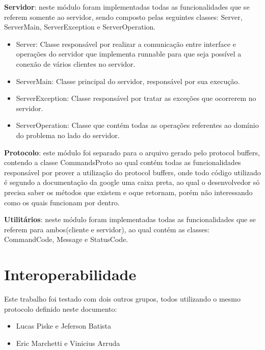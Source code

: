 \documentclass[
	11pt,				%
	oneside,			%
	a4paper,			%
	english,			%
	brazil,				%
	]{article}
\begin{document}
\textbf{Servidor}: neste módulo foram implementadas todas as funcionalidades que se referem somente ao servidor, sendo composto pelas seguintes classes:
Server, ServerMain, ServerException e ServerOperation.

\begin{itemize}
 \item Server: Classe responsável por realizar a comunicação entre interface e operações do servidor que implementa runnable para que seja possível a conexão de vários clientes no servidor.
 \item ServerMain: Classe principal do servidor, responsável por sua execução.
 \item ServerException: Classe responsável por tratar as exceções que ocorrerem no servidor.
 \item ServerOperation: Classe que contém todas as operações referentes ao domínio do problema no lado do servidor.
\end{itemize}

\textbf{Protocolo}: este módulo foi separado para o arquivo gerado pelo protocol buffers, contendo a classe CommandsProto ao qual contém todas as funcionalidades responsável por prover a utilização do protocol buffers, onde todo código utilizado é segundo a documentação da google uma caixa 
preta, ao qual o desenvolvedor só precisa saber os métodos que existem e oque retornam, porém não interessando como os quais funcionam por dentro.

\textbf{Utilitários}: neste módulo foram implementadas todas as funcionalidades que se referem para ambos(cliente e servidor), ao qual contém as classes: CommandCode, Message e StatusCode.

\section{Interoperabilidade}
Este trabalho foi testado com dois outros grupos, todos utilizando o mesmo protocolo definido neste documento:
\begin{itemize}
 \item Lucas Piske e Jeferson Batista
 \item Eric Marchetti e Vinicius Arruda
\end{itemize}

\end{document}
